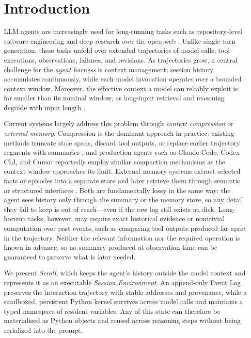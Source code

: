 \section{Introduction}
\label{sec:intro}

LLM agents are increasingly used for long-running tasks such as repository-level software engineering \citep{jimenez2024swebench,yang2024sweagent} and deep research over the open web \citep{zheng2025deepresearcher,wei2025browsecomp}.
Unlike single-turn generation, these tasks unfold over extended trajectories of model calls, tool executions, observations, failures, and revisions. As trajectories grow, a central challenge for the \emph{agent harness} is context management: session history accumulates continuously, while each model invocation operates over a bounded context window. Moreover, the effective context a model can reliably exploit is far smaller than its nominal window, as long-input retrieval and reasoning degrade with input length \citep{modarressi2025nolima,zeng2026loca}.

Current systems largely address this problem through \emph{context compression} or \emph{external memory}.
Compression is the dominant approach in practice: existing methods truncate stale spans, discard tool outputs, or replace earlier trajectory segments with summaries \citep{kang2025acon,ye2025agentfold}, and production agents such as Claude Code, Codex CLI, and Cursor reportedly employ similar compaction mechanisms as the context window approaches its limit.
External memory systems extract selected facts or episodes into a separate store and later retrieve them through semantic or structured interfaces \citep{packer2023memgpt,wu2025longmemeval, cao2026remember}. 
Both are fundamentally lossy in the same way: the agent sees history only through the summary or the memory store, so any detail they fail to keep is out of reach---even if the raw log still exists on disk.
Long-horizon tasks, however, may require exact historical evidence or nontrivial computation over past events, such as comparing tool outputs produced far apart in the trajectory. Neither the relevant information nor the required operation is known in advance, so no summary produced at observation time can be guaranteed to preserve what is later needed.


We present \emph{Scroll}, which keeps the agent's history outside the model context \citep{zhang2025rlm} and represents it as an executable \emph{Session Environment}. 
An append-only Event Log preserves the interaction trajectory with stable addresses and provenance, while a sandboxed, persistent Python kernel survives across model calls and maintains a typed namespace of resident variables. Any of this state can therefore be materialized as Python objects and reused across reasoning steps without being serialized into the prompt.

